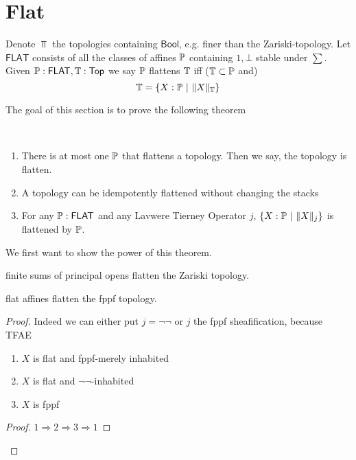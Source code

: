 \section{Flat}


\begin{definition}
	Denote $\Top$ the topologies containing $\mathsf{Bool}$, e.g. finer than the Zariski-topology.
	Let $\mathsf{FLAT}$ consists of all the classes of affines $\mathbb{P}$ containing $1, \bot$ stable under $\sum$. \\
	Given $\mathbb{P}: \mathsf{FLAT} , \mathbb{T}: \operatorname{\mathsf{Top}}$ we say $\mathbb{P}$ flattens $\mathbb{T}$ iff ($\mathbb{T} \subset \mathbb{P}$ and)
	\[
		\mathbb{T}= \{X : \mathbb{P}\ | \ \|X\|_{\mathbb{T}} \}
	\]
\end{definition}
The goal of this section is to prove the following theorem
\begin{theorem}{\label{thm:Flat}}
 \
	\begin{enumerate}
		\item There is at most one $\mathbb{P}$ that flattens a topology. Then we say, the topology is flatten.
		\item A topology can be idempotently flattened without changing the stacks
		\item For any $\mathbb{P}: \mathsf{FLAT}$ and any Lavwere Tierney Operator $j$, $\{ X: \mathbb{P} \ | \ \|X\|_j \}$ is flattened by $\mathbb{P}$.
	\end{enumerate}
\end{theorem}
We first want to show the power of this theorem.
\begin{example}
	finite sums of principal opens flatten the Zariski topology. 
\end{example}
\begin{example}
	flat affines flatten the fppf topology. %
\end{example}
\begin{proof}
	Indeed we can either put $j = \lnot \lnot$ or $j$ the fppf sheafification, because TFAE
	\begin{enumerate}
		\item  $X$ is flat and fppf-merely inhabited
		\item $X$ is flat  and $\lnot\lnot$-inhabited
		\item $X$ is fppf
	\end{enumerate}
	
	\begin{proof}
		$1 \Rightarrow 2 \Rightarrow 3 \Rightarrow 1$ \todocite
	\end{proof}	 
	
\end{proof}
